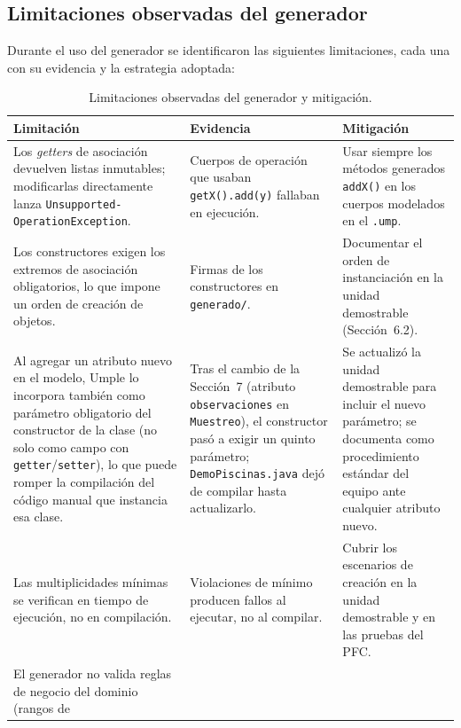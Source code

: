 \documentclass[11pt,a4paper]{article}
\begin{document}
\subsection{Limitaciones observadas del generador}

Durante el uso del generador se identificaron las siguientes
limitaciones, cada una con su evidencia y la estrategia adoptada:

\begin{table}[H]
  \centering
  \caption{Limitaciones observadas del generador y mitigación.}
  \begin{tabular}{|p{4.2cm}|p{4.6cm}|p{4.6cm}|}
    \hline
    \textbf{Limitación} & \textbf{Evidencia} & \textbf{Mitigación} \\
    \hline
    Los \emph{getters} de asociación devuelven listas inmutables;
    modificarlas directamente lanza
    \texttt{Unsupported-}\allowbreak\texttt{OperationException}. &
    Cuerpos de operación que usaban
    \texttt{getX().add(y)} fallaban en ejecución. &
    Usar siempre los métodos generados \texttt{addX()} en los cuerpos
    modelados en el \texttt{.ump}. \\
    \hline
    Los constructores exigen los extremos de asociación obligatorios,
    lo que impone un orden de creación de objetos. &
    Firmas de los constructores en
    \texttt{generado/}. &
    Documentar el orden de instanciación en la unidad demostrable
    (Sección~6.2). \\
    \hline
    Al agregar un atributo nuevo en el modelo, Umple lo incorpora
    también como parámetro obligatorio del constructor de la clase
    (no solo como campo con \texttt{getter}/\texttt{setter}), lo que
    puede romper la compilación del código manual que instancia esa
    clase. &
    Tras el cambio de la Sección~7 (atributo \texttt{observaciones} en
    \texttt{Muestreo}), el constructor pasó a exigir un quinto
    parámetro; \texttt{DemoPiscinas.java} dejó de compilar hasta
    actualizarlo. &
    Se actualizó la unidad demostrable para incluir el nuevo
    parámetro; se documenta como procedimiento estándar del equipo
    ante cualquier atributo nuevo. \\
    \hline
    Las multiplicidades mínimas se verifican en tiempo de ejecución,
    no en compilación. &
    Violaciones de mínimo producen fallos al ejecutar, no al
    compilar. &
    Cubrir los escenarios de creación en la unidad demostrable y en
    las pruebas del PFC. \\
    \hline
    El generador no valida reglas de negocio del dominio (rangos de

\end{tabular}
\end{table}
\end{document}
